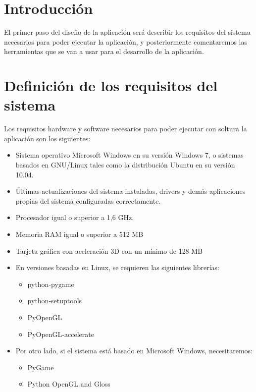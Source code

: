 

\section{Introducción}

El primer paso del diseño de la aplicación será describir los requisitos del
sistema necesarios para poder ejecutar la aplicación, y posteriormente comentaremos las herramientas que se
van a usar para el desarrollo de la aplicación.

\section{Definición de los requisitos del sistema}


Los requisitos hardware y software necesarios para poder ejecutar con soltura la aplicación son los siguientes:

\begin{itemize}
	\item Sistema operativo Microsoft Windows en su versión Windows 7, o sistemas basados en GNU/Linux tales como
		la distribución Ubuntu en su versión 10.04.
	\item Últimas actualizaciones del sistema instaladas, drivers y demás aplicaciones propias del sistema
		configuradas correctamente.
	\item Procesador igual o superior a 1,6 GHz.
	\item Memoria RAM igual o superior a 512 MB
	\item Tarjeta gráfica con aceleración 3D con un mínimo de 128 MB
	\item En versiones basadas en Linux, se requieren las siguientes librerías:
		\begin{itemize}
			\item python-pygame
			\item python-setuptools
			\item PyOpenGL
			\item PyOpenGL-accelerate
		\end{itemize}
	\item Por otro lado, si el sistema está basado en Microsoft Windows, necesitaremos:
		\begin{itemize}
			\item PyGame
			\item Python OpenGL and Gloss
		\end{itemize}
\end{itemize}

